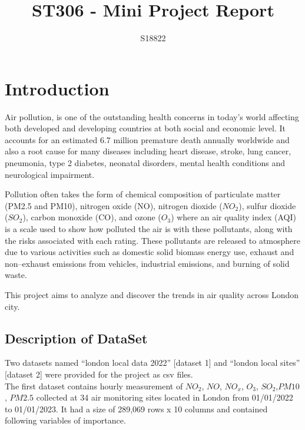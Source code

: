 \documentclass[]{article}
\title{ST306 - Mini Project Report}
\author{S18822}
\begin{document}
\maketitle
\section{Introduction}
\indent Air pollution, is one of the outstanding health concerns in today’s world affecting both developed and developing countries at both social and economic level. It accounts for an estimated 6.7 million premature death annually worldwide and also a root cause for many diseases including heart disease, stroke, lung cancer, pneumonia, type 2 diabetes, neonatal disorders, mental health conditions and neurological impairment.

Pollution often takes the form of chemical composition of particulate matter (PM2.5 and PM10), nitrogen oxide (NO), nitrogen dioxide ($NO_2$), sulfur dioxide ($SO_2$), carbon monoxide (CO), and ozone ($O_3$) where an air quality index (AQI) is a scale used to show how polluted the air is with these pollutants, along with the risks associated with each rating. These pollutants are released to atmosphere due to various activities such as domestic solid biomass energy use, exhaust and non–exhaust emissions from vehicles, industrial emissions, and burning of solid waste.

This project aims to analyze and discover the trends in air quality across London city.

\subsection{Description of DataSet}
Two datasets named “london local data 2022” [dataset 1] and  “london local sites” [dataset 2] were provided for the project as csv files.\\

The first dataset contains hourly measurement of $NO_2$, $NO$, $NO_x$, $O_3$, $SO_2$,$PM10$, $PM2.5$ collected at 34 air monitoring sites located in London from 01/01/2022 to 01/01/2023.
 It had a size of 289,069 rows x 10 columns and contained following variables of importance.
\end{document}
